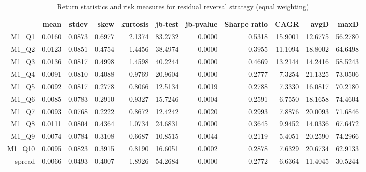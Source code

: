 \begin{table}[ht]
\centering
\begin{tabular}{rrrrrrrrrrr}
  \hline
 & mean & stdev & skew & kurtosis & jb-test & jb-pvalue & Sharpe ratio & CAGR & avgD & maxD \\ 
  \hline
M1\_Q1 & 0.0160 & 0.0873 & 0.6977 & 2.1374 & 83.2732 & 0.0000 & 0.5318 & 15.9001 & 12.6775 & 56.2780 \\ 
  M1\_Q2 & 0.0123 & 0.0851 & 0.4754 & 1.4456 & 38.4974 & 0.0000 & 0.3955 & 11.1094 & 18.8002 & 64.6498 \\ 
  M1\_Q3 & 0.0136 & 0.0817 & 0.4998 & 1.4598 & 40.2244 & 0.0000 & 0.4669 & 13.2144 & 14.2416 & 58.5243 \\ 
  M1\_Q4 & 0.0091 & 0.0810 & 0.4088 & 0.9769 & 20.9604 & 0.0000 & 0.2777 & 7.3254 & 21.1325 & 73.0506 \\ 
  M1\_Q5 & 0.0092 & 0.0817 & 0.2778 & 0.8066 & 12.5134 & 0.0019 & 0.2788 & 7.3330 & 16.0817 & 70.2180 \\ 
  M1\_Q6 & 0.0085 & 0.0783 & 0.2910 & 0.9327 & 15.7246 & 0.0004 & 0.2591 & 6.7550 & 18.1658 & 74.4604 \\ 
  M1\_Q7 & 0.0093 & 0.0768 & 0.2222 & 0.8672 & 12.4242 & 0.0020 & 0.2993 & 7.8876 & 20.0093 & 71.6846 \\ 
  M1\_Q8 & 0.0111 & 0.0804 & 0.4364 & 1.0734 & 24.6831 & 0.0000 & 0.3645 & 9.9452 & 14.0336 & 67.6472 \\ 
  M1\_Q9 & 0.0074 & 0.0784 & 0.3108 & 0.6687 & 10.8515 & 0.0044 & 0.2119 & 5.4051 & 20.2590 & 74.2966 \\ 
  M1\_Q10 & 0.0095 & 0.0823 & 0.3915 & 0.8190 & 16.6051 & 0.0002 & 0.2878 & 7.6329 & 20.6734 & 62.9133 \\ 
  spread & 0.0066 & 0.0493 & 0.4007 & 1.8926 & 54.2684 & 0.0000 & 0.2772 & 6.6364 & 11.4045 & 30.5244 \\ 
   \hline
\end{tabular}
\caption{Return statistics and risk measures for residual 
                             reversal strategy (equal weighting)} 
\label{tab:returnRevStats}
\end{table}
